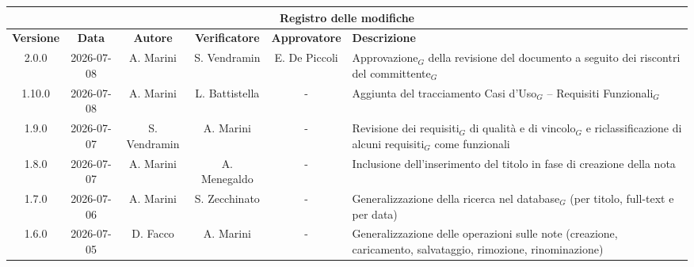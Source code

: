 \documentclass[a4paper, 10pt]{article}
\begin{document}
\raggedbottom

\setlength{\emergencystretch}{2em}

\newcommand{\titolo}{Analisi dei Requisiti}
\newcommand{\dataverbale}{}
\newcommand{\dataversione}{2026-07-08}
\newcommand{\versione}{2.0.0}
\newcommand{\stato}{Approvato}
\newcommand{\destinatari}{The Bitless, prof. T. Vardanega, prof. R. Cardin, Zucchetti}
\def\templatedir{../../../templates}
\setcounter{secnumdepth}{5}
\setcounter{tocdepth}{5}

\begin{titlepage}

\end{titlepage}

\newpage
{}

\begingroup
\small
\begin{longtable}{|c|c|c|c|c|p{3cm}|}
    \hline
    \multicolumn{6}{|c|}{\textbf{Registro delle modifiche}} \\
    \hline
    \textbf{Versione} & \textbf{Data} & \textbf{Autore} & \textbf{Verificatore} & \textbf{Approvatore} & \textbf{Descrizione} \\
    \hline
    \endhead
    2.0.0 & 2026-07-08 & A. Marini & S. Vendramin & E. De Piccoli & Approvazione$_G$ della revisione del documento a seguito dei riscontri del committente$_G$\\ \hline

    1.10.0 & 2026-07-08 & A. Marini & L. Battistella & - & Aggiunta del tracciamento Casi d'Uso$_G$ -- Requisiti Funzionali$_G$\\ \hline

    1.9.0 & 2026-07-07 & S. Vendramin & A. Marini & - & Revisione dei requisiti$_G$ di qualità e di vincolo$_G$ e riclassificazione di alcuni requisiti$_G$ come funzionali\\ \hline

    1.8.0 & 2026-07-07 & A. Marini & A. Menegaldo & - & Inclusione dell'inserimento del titolo in fase di creazione della nota\\ \hline

    1.7.0 & 2026-07-06 & A. Marini & S. Zecchinato & - & Generalizzazione della ricerca nel database$_G$ (per titolo, full-text e per data)\\ \hline

    1.6.0 & 2026-07-05 & D. Facco & A. Marini & - & Generalizzazione delle operazioni sulle note (creazione, caricamento, salvataggio, rimozione, rinominazione)\\ \hline


\end{longtable}
\end{document}

